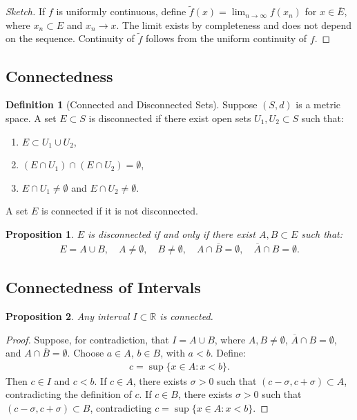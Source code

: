 \documentclass[9pt]{article}
\theoremstyle{definition}
\newtheorem{definition}{Definition}
\theoremstyle{plain}
\newtheorem{proposition}{Proposition}
\begin{document}
\begin{proof}[Sketch]
If $ f $ is uniformly continuous, define $ \tilde{f}(x) = \lim_{n \to \infty} f(x_n) $ for $ x \in \overline{E} $, where $ x_n \subset E $ and $ x_n \to x $. The limit exists by completeness and does not depend on the sequence. Continuity of $ \tilde{f} $ follows from the uniform continuity of $ f $.
\end{proof}

\subsection*{Connectedness}
\begin{definition}[Connected and Disconnected Sets]
Suppose $ (S, d) $ is a metric space. A set $ E \subset S $ is disconnected if there exist open sets $ U_1, U_2 \subset S $ such that:
\begin{enumerate}
    \item $ E \subset U_1 \cup U_2 $,
    \item $ (E \cap U_1) \cap (E \cap U_2) = \emptyset $,
    \item $ E \cap U_1 \neq \emptyset $ and $ E \cap U_2 \neq \emptyset $.
\end{enumerate}
A set $ E $ is connected if it is not disconnected.
\end{definition}

\begin{proposition}
$ E $ is disconnected if and only if there exist $ A, B \subset E $ such that:
\begin{align}
E = A \cup B, \quad A \neq \emptyset, \quad B \neq \emptyset, \quad A \cap \overline{B} = \emptyset, \quad \overline{A} \cap B = \emptyset.
\end{align}
\end{proposition}

\subsection*{Connectedness of Intervals}
\begin{proposition}
Any interval $ I \subset \mathbb{R} $ is connected.
\end{proposition}

\begin{proof}
Suppose, for contradiction, that $ I = A \cup B $, where $ A, B \neq \emptyset $, $ \overline{A} \cap B = \emptyset $, and $ A \cap \overline{B} = \emptyset $. Choose $ a \in A $, $ b \in B $, with $ a < b $. Define:
\begin{align}
c = \sup \{x \in A : x < b\}.
\end{align}
Then $ c \in I $ and $ c < b $. If $ c \in A $, there exists $ \sigma > 0 $ such that $ (c - \sigma, c + \sigma) \subset A $, contradicting the definition of $ c $. If $ c \in B $, there exists $ \sigma > 0 $ such that $ (c - \sigma, c + \sigma) \subset B $, contradicting $ c = \sup \{x \in A : x < b\} $.
\end{proof}
\end{document}
